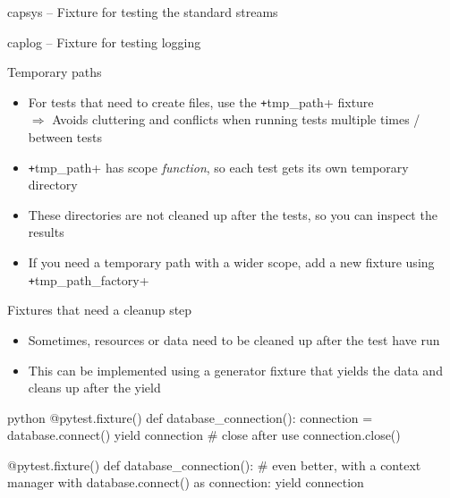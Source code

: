 \begin{frame}[c]{capsys – Fixture for testing the standard streams}
\end{frame}

\begin{frame}[c]{caplog – Fixture for testing logging}
\end{frame}

\begin{frame}[c]{Temporary paths}
  \begin{itemize}
    \item For tests that need to create files, use the \texttt+tmp_path+ fixture \\
      $⇒$ Avoids cluttering and conflicts when running tests multiple times / between tests
    \item \texttt+tmp_path+ has scope \emph{function}, so each test gets its own temporary directory
    \item These directories are not cleaned up after the tests, so you can inspect the results
    \item If you need a temporary path with a wider scope, add a new fixture using \texttt+tmp_path_factory+
  \end{itemize}
\end{frame}


\begin{frame}[c, fragile]{Fixtures that need a cleanup step}
  \begin{itemize}
    \item Sometimes, resources or data need to be cleaned up after the test have run
    \item This can be implemented using a generator fixture that yields the data and cleans up after the yield
  \end{itemize}

  \begin{code}{python}
    @pytest.fixture()
    def database_connection():
        connection = database.connect()
        yield connection
        # close after use
        connection.close()

    @pytest.fixture()
    def database_connection():
        # even better, with a context manager
        with database.connect() as connection:
            yield connection
  \end{code}
\end{frame}

